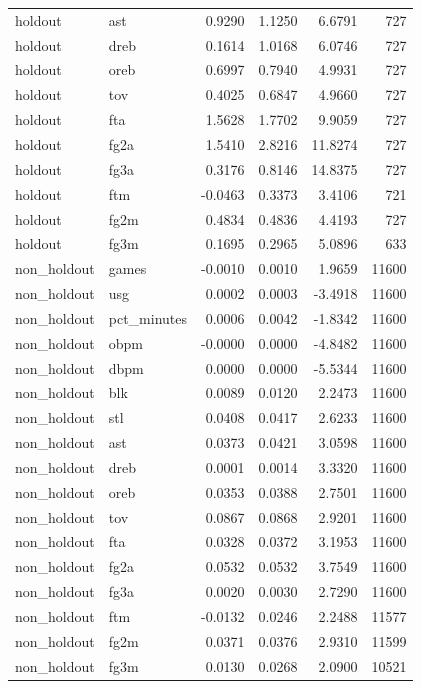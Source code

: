\begin{table}
\begin{tabular}{llrrrr}
holdout & ast & 0.9290 & 1.1250 & 6.6791 & 727 \\
holdout & dreb & 0.1614 & 1.0168 & 6.0746 & 727 \\
holdout & oreb & 0.6997 & 0.7940 & 4.9931 & 727 \\
holdout & tov & 0.4025 & 0.6847 & 4.9660 & 727 \\
holdout & fta & 1.5628 & 1.7702 & 9.9059 & 727 \\
holdout & fg2a & 1.5410 & 2.8216 & 11.8274 & 727 \\
holdout & fg3a & 0.3176 & 0.8146 & 14.8375 & 727 \\
holdout & ftm & -0.0463 & 0.3373 & 3.4106 & 721 \\
holdout & fg2m & 0.4834 & 0.4836 & 4.4193 & 727 \\
holdout & fg3m & 0.1695 & 0.2965 & 5.0896 & 633 \\
non\_holdout & games & -0.0010 & 0.0010 & 1.9659 & 11600 \\
non\_holdout & usg & 0.0002 & 0.0003 & -3.4918 & 11600 \\
non\_holdout & pct\_minutes & 0.0006 & 0.0042 & -1.8342 & 11600 \\
non\_holdout & obpm & -0.0000 & 0.0000 & -4.8482 & 11600 \\
non\_holdout & dbpm & 0.0000 & 0.0000 & -5.5344 & 11600 \\
non\_holdout & blk & 0.0089 & 0.0120 & 2.2473 & 11600 \\
non\_holdout & stl & 0.0408 & 0.0417 & 2.6233 & 11600 \\
non\_holdout & ast & 0.0373 & 0.0421 & 3.0598 & 11600 \\
non\_holdout & dreb & 0.0001 & 0.0014 & 3.3320 & 11600 \\
non\_holdout & oreb & 0.0353 & 0.0388 & 2.7501 & 11600 \\
non\_holdout & tov & 0.0867 & 0.0868 & 2.9201 & 11600 \\
non\_holdout & fta & 0.0328 & 0.0372 & 3.1953 & 11600 \\
non\_holdout & fg2a & 0.0532 & 0.0532 & 3.7549 & 11600 \\
non\_holdout & fg3a & 0.0020 & 0.0030 & 2.7290 & 11600 \\
non\_holdout & ftm & -0.0132 & 0.0246 & 2.2488 & 11577 \\
non\_holdout & fg2m & 0.0371 & 0.0376 & 2.9310 & 11599 \\
non\_holdout & fg3m & 0.0130 & 0.0268 & 2.0900 & 10521 \\
\bottomrule
\end{tabular}
\end{table}
